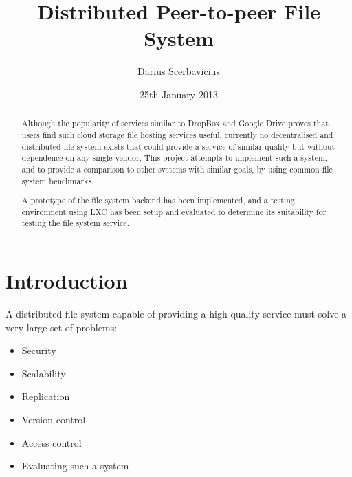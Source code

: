 \documentclass[a4paper, 11pt]{article}
\title{Distributed Peer-to-peer File System}
\author{Darius Scerbavicius}
\date{25th January 2013}
\begin{document}
\maketitle

\begin{abstract}
Although the popularity of services similar to DropBox and Google Drive proves that 
users find such cloud storage file hosting services useful,
currently no decentralised and distributed file system exists that could provide
a service of similar quality but without dependence on any single vendor.
This project attempts to implement such a system,
and to provide a comparison to other systems with similar goals, by using common
file system benchmarks. 

A prototype of the file system backend has been implemented, and a testing environment
using LXC has been setup and evaluated to determine its suitability for testing the 
file system service.

\end{abstract}

\section{Introduction}

A distributed file system capable of providing a high quality service must solve a very large set 
of problems:

\begin{itemize}
\item Security
\item Scalability
\item Replication
\item Version control
\item Access control
\item Evaluating such a system
\end{itemize}

%
%
%
%
\end{document}
